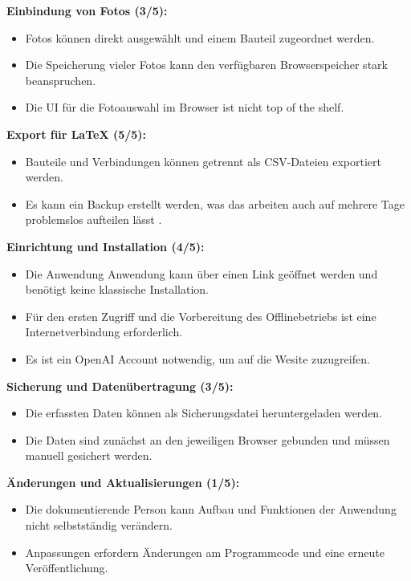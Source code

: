 \medskip
\textbf{Einbindung von Fotos (3/5):}
\begin{itemize}[leftmargin=2em, nosep]
    \item[\pluspunkt] Fotos können direkt ausgewählt und einem Bauteil
    zugeordnet werden.
    \item[\minuspunkt] Die Speicherung vieler Fotos kann den verfügbaren
    Browserspeicher stark beanspruchen.
    \item[\minuspunkt] Die UI für die Fotoauswahl im Browser ist nicht top of the shelf.
\end{itemize}

\medskip
\textbf{Export für \LaTeX{} (5/5):}
\begin{itemize}[leftmargin=2em, nosep]
    \item[\pluspunkt] Bauteile und Verbindungen können getrennt als
    CSV-Dateien exportiert werden.
    \item[\pluspunkt] Es kann ein Backup erstellt werden, was das arbeiten auch auf mehrere Tage problemslos aufteilen lässt .
\end{itemize}

\medskip
\textbf{Einrichtung und Installation (4/5):}
\begin{itemize}[leftmargin=2em, nosep]
    \item[\pluspunkt] Die Anwendung Anwendung kann über einen Link geöffnet
    werden und benötigt keine klassische Installation.
    \item[\minuspunkt] Für den ersten Zugriff und die Vorbereitung des
    Offlinebetriebs ist eine Internetverbindung erforderlich.
    \item[\minuspunkt] Es ist ein OpenAI Account notwendig, um auf die Wesite zuzugreifen.
\end{itemize}

\medskip
\textbf{Sicherung und Datenübertragung (3/5):}
\begin{itemize}[leftmargin=2em, nosep]
    \item[\pluspunkt] Die erfassten Daten können als Sicherungsdatei
    heruntergeladen werden.
    \item[\minuspunkt] Die Daten sind zunächst an den jeweiligen Browser
    gebunden und müssen manuell gesichert werden.
\end{itemize}

\medskip
\textbf{Änderungen und Aktualisierungen (1/5):}
\begin{itemize}[leftmargin=2em, nosep]
    \item[\minuspunkt] Die dokumentierende Person kann Aufbau und Funktionen
    der Anwendung nicht selbstständig verändern.
    \item[\minuspunkt] Anpassungen erfordern Änderungen am Programmcode und
    eine erneute Veröffentlichung.
\end{itemize}

